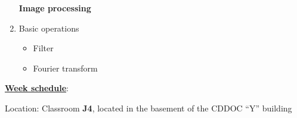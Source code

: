 \documentclass[letter,11pt]{article}
\begin{document}
\begin{enumerate}
\vspace{0.2cm}
\Large \textbf{Image processing} \large
    \item Basic operations
    \begin{itemize}
        \vspace{-0.3cm}
        \item Filter
        \item Fourier transform
    \end{itemize}

\end{enumerate}


\underline{\textbf{Week schedule}}:

\pagestyle{empty} %

\setlength{\parindent}{0pt} %


Location: Classroom \textbf{J4}, located in the basement of the CDDOC “Y” building
\Large
\end{document}
